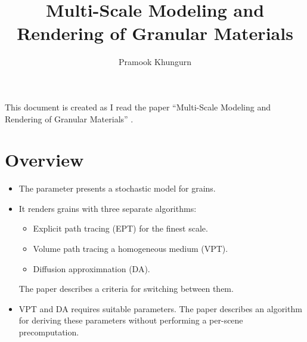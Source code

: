 \documentclass[10pt]{article}
\title{Multi-Scale Modeling and Rendering of Granular Materials}
\author{Pramook Khungurn}
\begin{document}
  \maketitle

  This document is created as I read the paper ``Multi-Scale Modeling and Rendering of Granular Materials'' \cite{Meng:2015}.

  \section{Overview}
  \begin{itemize}
  	\item The parameter presents a stochastic model for grains.
  	
  	\item It renders grains with three separate algorithms:
  	\begin{itemize}
  		\item Explicit path tracing (EPT) for the finest scale.
  		\item Volume path tracing a homogeneous medium (VPT).
  		\item Diffusion approximnation (DA).  		
  	\end{itemize}  	
  	The paper describes a criteria for switching between them.

  	\item VPT and DA requires suitable parameters.  The paper describes an algorithm for deriving these parameters without performing a per-scene precomputation.  	  	
  \end{itemize}
\end{document}
